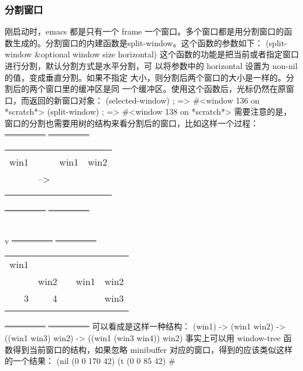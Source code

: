 \documentclass[11pt]{ctexart}
\begin{document}
{{{{\subsubsection{分割窗口}
\label{sec:org0144310}
刚启动时，emacs 都是只有一个 frame 一个窗口。多个窗口都是用分割窗口的函 数生成的。分割窗口的内建函数是split-window。这个函数的参数如下：
(split-window \&optional window size horizontal)
这个函数的功能是把当前或者指定窗口进行分割，默认分割方式是水平分割，可 以将参数中的 horizontal 设置为 non-nil 的值，变成垂直分割。如果不指定 大小，则分割后两个窗口的大小是一样的。分割后的两个窗口里的缓冲区是同 一个缓冲区。使用这个函数后，光标仍然在原窗口，而返回的新窗口对象：
(selected-window)                       ; => \#<window 136 on *scratch*>
(split-window)                          ; => \#<window 138 on *scratch*>
需要注意的是，窗口的分割也需要用树的结构来看分割后的窗口，比如这样一个过程：
\sout{---------------}         \sout{---------------}
\begin{center}
\begin{tabular}{llll}
 &  &  & \\
win1 &  & win1 & win2\\
 & --> &  & \\
 &  &  & \\
 &  &  & \\
\end{tabular}
\end{center}
\sout{---------------}         \sout{---------------}
\begin{center}
\begin{tabular}{}
\\
\end{tabular}
\end{center}
v
\sout{---------------}         \sout{---------------}
\begin{center}
\begin{tabular}{rrlll}
win1 &  &  &  & \\
 & win2 &  & win1 & win2\\
\hline
3 & 4 &  &  & win3 & \\
 &  &  &  &  & \\
\end{tabular}
\end{center}
\sout{---------------}         \sout{---------------}
可以看成是这样一种结构：
(win1) ->  (win1 win2) -> ((win1 win3) win2) -> ((win1 (win3 win4)) win2)
事实上可以用 window-tree 函数得到当前窗口的结构，如果忽略 minibuffer 对应的窗口，得到的应该类似这样的一个结果：
(nil (0 0 170 42)
(t (0 0 85 42)
\#<win 3>
}}}}
\end{document}

